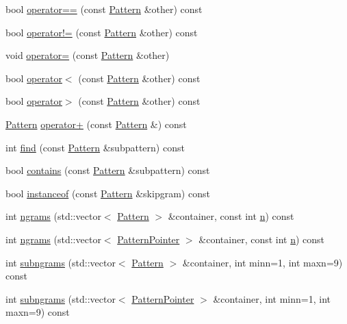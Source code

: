\begin{DoxyCompactItemize}
\item 
bool \hyperlink{classPattern_a2b5a2c979473b3a62b17128f4c628be2}{operator==} (const \hyperlink{classPattern}{Pattern} \&other) const 
\item 
bool \hyperlink{classPattern_ac02b6479822d7c9ad1beb12dc26eb419}{operator!=} (const \hyperlink{classPattern}{Pattern} \&other) const 
\item 
void \hyperlink{classPattern_ae0ea02ade72a1fe7f92cd48d98754559}{operator=} (const \hyperlink{classPattern}{Pattern} \&other)
\item 
bool \hyperlink{classPattern_aaad79201ca656e519b069cd746722d1b}{operator$<$} (const \hyperlink{classPattern}{Pattern} \&other) const 
\item 
bool \hyperlink{classPattern_a638524274293c8001ec8c605ea5697a5}{operator$>$} (const \hyperlink{classPattern}{Pattern} \&other) const 
\item 
\hyperlink{classPattern}{Pattern} \hyperlink{classPattern_a023243f162cf922306129c14ea7786f7}{operator+} (const \hyperlink{classPattern}{Pattern} \&) const 
\item 
int \hyperlink{classPattern_abcd8d461a6c7ebdafe764f959f152c83}{find} (const \hyperlink{classPattern}{Pattern} \&subpattern) const 
\item 
bool \hyperlink{classPattern_aa0de9e5bf5611e8072b0324869e2f782}{contains} (const \hyperlink{classPattern}{Pattern} \&subpattern) const 
\item 
bool \hyperlink{classPattern_a62563035a235a84b77fc4bd97bc82e0e}{instanceof} (const \hyperlink{classPattern}{Pattern} \&skipgram) const 
\item 
int \hyperlink{classPattern_a776b95441fb7c4cdd159c7df7b9097af}{ngrams} (std\+::vector$<$ \hyperlink{classPattern}{Pattern} $>$ \&container, const int \hyperlink{classPattern_a13e66bbb8dd77219255ade5aa5f72c7c}{n}) const 
\item 
int \hyperlink{classPattern_ad2a401cd64493ce88725a14333a3d4e4}{ngrams} (std\+::vector$<$ \hyperlink{classPatternPointer}{Pattern\+Pointer} $>$ \&container, const int \hyperlink{classPattern_a13e66bbb8dd77219255ade5aa5f72c7c}{n}) const 
\item 
int \hyperlink{classPattern_a6a7b34dfc31443c28f4769a21ddebaad}{subngrams} (std\+::vector$<$ \hyperlink{classPattern}{Pattern} $>$ \&container, int minn=1, int maxn=9) const 
\item 
int \hyperlink{classPattern_aae7ead84de1198aa1576b39baaceaf52}{subngrams} (std\+::vector$<$ \hyperlink{classPatternPointer}{Pattern\+Pointer} $>$ \&container, int minn=1, int maxn=9) const 

\end{DoxyCompactItemize}
